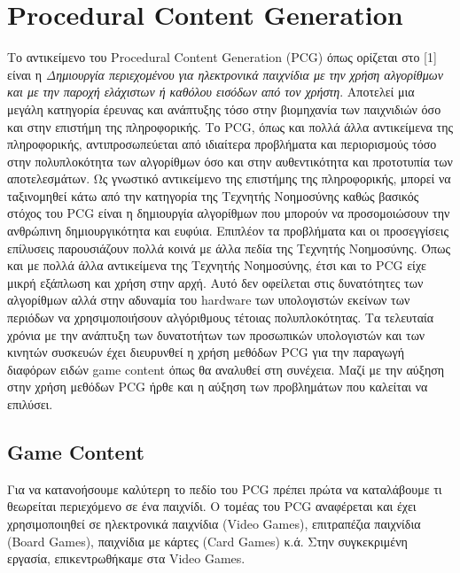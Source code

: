 \thispagestyle{empty}

\chapter{Procedural Content Generation}

Το αντικείμενο του Procedural Content Generation (PCG) όπως ορίζεται στο [1] είναι η \textit{Δημιουργία περιεχομένου για ηλεκτρονικά παιχνίδια με την χρήση αλγορίθμων και με την παροχή ελάχιστων ή καθόλου εισόδων από τον χρήστη}. Αποτελεί μια μεγάλη κατηγορία έρευνας και ανάπτυξης τόσο στην βιομηχανία των  παιχνιδιών όσο και στην επιστήμη της πληροφορικής. Το PCG, όπως και πολλά άλλα αντικείμενα της πληροφορικής, αντιπροσωπεύεται από ιδιαίτερα προβλήματα και περιορισμούς τόσο στην πολυπλοκότητα των αλγορίθμων όσο και στην αυθεντικότητα και προτοτυπία των αποτελεσμάτων.  Ως γνωστικό αντικείμενο της επιστήμης της πληροφορικής, μπορεί να ταξινομηθεί κάτω από την κατηγορία της Τεχνητής Νοημοσύνης καθώς βασικός στόχος του PCG είναι η δημιουργία αλγορίθμων που μπορούν να προσομοιώσουν την ανθρώπινη δημιουργικότητα και ευφύια. Επιπλέον τα προβλήματα και οι προσεγγίσεις επίλυσεις παρουσιάζουν πολλά κοινά με άλλα πεδία της Τεχνητής Νοημοσύνης.
\newline
Όπως και με πολλά άλλα αντικείμενα της Τεχνητής Νοημοσύνης, έτσι και το PCG είχε μικρή εξάπλωση και χρήση στην αρχή. Αυτό δεν οφείλεται στις δυνατότητες των αλγορίθμων αλλά στην αδυναμία του hardware των υπολογιστών εκείνων των περιόδων να χρησιμοποιήσουν αλγόριθμους τέτοιας πολυπλοκότητας. Τα τελευταία χρόνια με την ανάπτυξη των δυνατοτήτων των προσωπικών υπολογιστών και των κινητών συσκευών έχει διευρυνθεί η χρήση μεθόδων PCG για την παραγωγή διαφόρων ειδών game content όπως θα αναλυθεί στη συνέχεια. Μαζί με την αύξηση στην χρήση μεθόδων PCG ήρθε και η αύξηση των προβλημάτων που καλείται να επιλύσει.

\vspace{60mm}

\section{Game Content}
Για να κατανοήσουμε καλύτερη το πεδίο του PCG πρέπει πρώτα να καταλάβουμε τι θεωρείται περιεχόμενο σε ένα παιχνίδι. Ο τομέας του PCG αναφέρεται και έχει χρησιμοποιηθεί σε ηλεκτρονικά παιχνίδια (Video Games), επιτραπέζια παιχνίδια (Board Games), παιχνίδια με κάρτες (Card Games) κ.ά. Στην συγκεκριμένη εργασία, επικεντρωθήκαμε στα Video Games.

